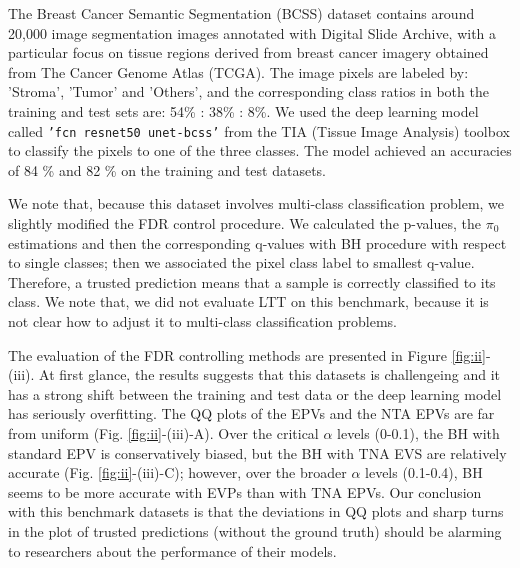 \documentclass{article}
\begin{document}
The Breast Cancer Semantic Segmentation (BCSS) dataset \cite{Amgad2019StructuredCE} contains around 20,000 image segmentation images annotated with Digital Slide Archive, with a particular focus on tissue regions derived from breast cancer imagery obtained from The Cancer Genome Atlas (TCGA). The image pixels are labeled by: 'Stroma', 'Tumor' and 'Others', and the corresponding class ratios in both the training and test sets are: 54\% : 38\% : 8\%. We used the deep learning model called \texttt{'fcn resnet50 unet-bcss'} from the TIA (Tissue Image Analysis) toolbox \cite{Pocock2022} to classify the pixels to one of the three classes. The model achieved an accuracies of 84 \% and 82 \% on the training and test datasets. 

We note that, because this dataset involves multi-class classification problem, we slightly modified the FDR control procedure. We calculated the p-values, the $\pi_0$ estimations and then the corresponding q-values with BH procedure with respect to single classes; then we associated the pixel class label to smallest q-value. Therefore, a trusted prediction means that a sample is correctly classified to its class. We note that, we did not evaluate LTT on this benchmark, because it is not clear how to adjust it to multi-class classification problems.

The evaluation of the FDR controlling methods are presented in Figure \ref{fig:ii}-(iii). At first glance, the results suggests that this datasets is challengeing and it  has a strong shift between the training and test data or the deep learning model has seriously overfitting. The QQ plots of the EPVs and the NTA EPVs are far from uniform (Fig. \ref{fig:ii}-(iii)-A). Over the critical $\alpha$ levels (0-0.1), the BH with standard EPV is conservatively biased, but the BH with TNA EVS are relatively accurate (Fig. \ref{fig:ii}-(iii)-C); however, over the broader $\alpha$ levels (0.1-0.4), BH seems to be more accurate with EVPs than with TNA EPVs. Our conclusion with this benchmark datasets is that the deviations in QQ plots and sharp turns in the plot of trusted predictions (without the ground truth) should be alarming to researchers about the performance of their models. 
\end{document}
